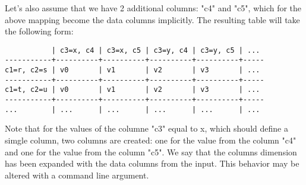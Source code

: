 \documentclass{report}
\begin{document}
Let's also assume that we have 2 additional columns: "c4" and "c5", which for
the above mapping become the data columns implicitly. The resulting table will
take the following form:

\begin{verbatim}
           | c3=x, c4 | c3=x, c5 | c3=y, c4 | c3=y, c5 | ...
-----------+----------+----------+----------+----------+-----
c1=r, c2=s | v0       | v1       | v2       | v3       | ...
-----------+----------+----------+----------+----------+-----
c1=t, c2=u | v0       | v1       | v2       | v3       | ...
-----------+----------+----------+----------+----------+-----
...        | ...      | ...      | ...      | ...      | ...
\end{verbatim}

Note that for the values of the columne "c3" equal to x, which should define
a simgle column, two columns are created: one for the value from the column
"c4" and one for the value from the column "c5". We say that the columns
dimension has been expanded with the data columns from the input. This behavior
may be altered with a command line argument.
\end{document}
